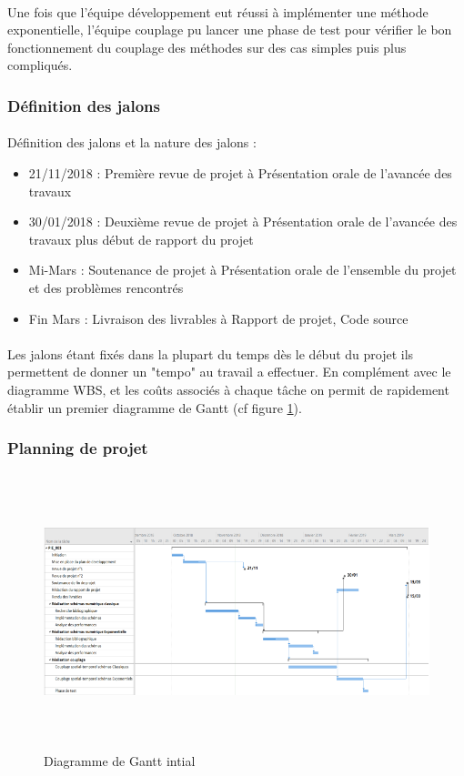     \paragraph{}
    Une fois que l'équipe développement eut réussi à implémenter une méthode exponentielle, l'équipe couplage pu lancer une phase de test pour vérifier le bon fonctionnement du couplage des méthodes sur des cas simples puis plus compliqués.
    
    \subsubsection{Définition des jalons}
    \paragraph{}
    Définition des jalons et la nature des jalons :
    \begin{itemize}
       	\item 21/11/2018 : Première revue de projet à Présentation orale de l'avancée des travaux
       	\item 30/01/2018 : Deuxième revue de projet à Présentation orale de l'avancée des travaux plus début de rapport du projet
       	\item  Mi-Mars : Soutenance de projet à Présentation orale de l'ensemble du projet et des problèmes rencontrés
       	\item  Fin Mars : Livraison des livrables à Rapport de projet, Code source
    \end{itemize}
    \paragraph{}
    Les jalons étant fixés dans la plupart du temps dès le début du projet ils permettent de donner un "tempo" au travail a effectuer. En complément avec le diagramme WBS, et les coûts associés à chaque tâche on permit de rapidement établir un premier diagramme de Gantt (cf figure \ref{fig:Gantt_initial}).

    \subsubsection{Planning de projet}
    \begin{figure}[h]
        \centering
        \includegraphics[width=\textwidth, height=8cm]{images/Gant.png}
        \caption{Diagramme de Gantt intial} 
    \label{fig:Gantt_initial}
    \end{figure}
